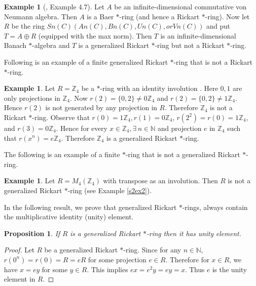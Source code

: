 \documentclass[11pt, one side,emlines]{amsart}
\newtheorem{proposition}[lemma]{Proposition}
\theoremstyle{definition}
\newtheorem{example}[lemma]{Example}
\numberwithin{equation}{section} \thispagestyle{empty} \voffset
\begin{document}
   \begin{example}[\cite{ahmadigen2021}, Example 4.7]
  	Let $A$ be an infinite-dimensional commutative von Neumann algebra. Then $A$ is a Baer $*$-ring (and hence a Rickart $*$-ring). Now let $R$ be the ring $Sn(C) (An(C), Bn(C), Un(C), or Vn(C))$ and put $T = A\oplus R$ (equipped with the max norm). Then $T$ is an infinite-dimensional Banach $*$-algebra and $T$ is a generalized Rickart $*$-ring but not a Rickart $*$-ring.
  \end{example}
 
   Following is an example of a finite generalized Rickart $*$-ring that is not a Rickart $*$-ring.
  
\begin{example}	Let $ R=\mathbb{Z}_4 $ be a $*$-ring with an identity involution .
 Here $0, 1$ are only projections in $ \mathbb{Z}_4 $.
 Now $ r(2)=\{0,2\} \ne 0\mathbb{Z}_4$ and $  r(2)=\{0,2\} \ne 1\mathbb{Z}_4 $.
 Hence $ r(2)$ is not generated by any projection in $R$. Therefore $ \mathbb{Z}_4 $ is not a Rickart $ *$-ring. Observe that $ r(0)=1 \mathbb{Z}_4, r(1)=0 \mathbb{Z}_4 $,
 $ r(2^2)=r(0)=1\mathbb{Z}_4 $, and  $r(3)=0 \mathbb{Z}_4$. 
 Hence for every $ x\in \mathbb{Z}_4,\exists~ n\in\mathbb{N} $ and projection $e$ in $ \mathbb{Z}_4 $ such that $ r(x^n)=e\mathbb{Z}_4 $. Therefore  $ \mathbb{Z}_4$ is a generalized Rickart $*$-ring.
 \end{example}
   
The following is an example of a finite $*$-ring that is not a generalized Rickart $*$-ring.
 
 \begin{example}  
 Let $ R=M_4(\mathbb{Z}_4) $ with transpose as an involution. Then $R$ is not a generalized Rickart $*$-ring (see Example \ref{s2ex2}). 
\end{example}

 In the following result, we prove that generalized Rickart $*$-rings, always contain the multiplicative identity (unity) element.
 
\begin{proposition} \label{s2pr1} If $R$ is a generalized  Rickart $ *$-ring then it has unity element.
\end{proposition}
\begin{proof} Let $R$ be a generalized  Rickart $ *$-ring.
	Since for any $ n\in\mathbb{N} $, $r(0^n)=r(0)=R=eR $ for some projection $e \in R$. 
	Therefore for $x\in R$, we have $x=ey$ for some $y \in R$. This implies $ex=e^2y=ey=x$.
	Thus $e$ is the unity element in $R$.
\end{proof}
\end{document}
